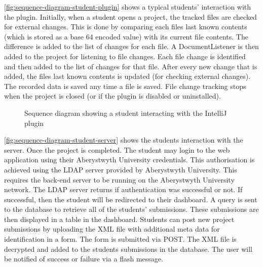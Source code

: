 \autoref{fig:sequence-diagram-student-plugin} shows a typical students' interaction with the plugin. Initially, when a student opens a project, the tracked files are checked for external changes. This is done by comparing each files last known contents (which is stored as a base 64 encoded value) with its current file contents. The difference is added to the list of changes for each file. A DocumentListener is then added to the project for listening to file changes. Each file change is identified and then added to the list of changes for that file. After every new change that is added, the files last known contents is updated (for checking external changes). The recorded data is saved any time a file is saved. File change tracking stops when the project is closed (or if the plugin is disabled or uninstalled).

\begin{figure}[H]
  \centering
  \caption[Student-plugin sequence diagram]{Sequence diagram showing a student interacting with the IntelliJ plugin}
  \label{fig:sequence-diagram-student-plugin}
\end{figure}

\autoref{fig:sequence-diagram-student-server} shows the students interaction with the server. Once the project is completed. The student may login to the web application using their Aberystwyth University credentials. This authorisation is achieved using the LDAP server provided by Aberystwyth University. This requires the back-end server to be running on the Aberystwyth University network. The LDAP server returns if authentication was successful or not. If successful, then the student will be redirected to their dashboard. A query is sent to the database to retrieve all of the students' submissions. These submissions are then displayed in a table in the dashboard. Students can post new project submissions by uploading the XML file with additional meta data for identification in a form. The form is submitted via POST. The XML file is decrypted and added to the students submissions in the database. The user will be notified of success or failure via a flash message.

